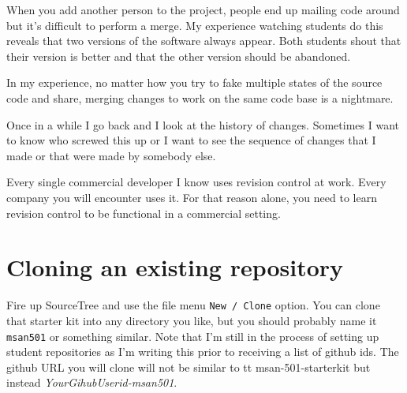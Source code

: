 \documentclass[titlepage]{tufte-book}
\begin{document}
When you add another person to the project, people end up mailing code around but it's difficult to perform a merge. My experience watching students do this reveals that two versions of the software always appear. Both students shout that their version is better and that the other version should be abandoned.

In my experience, no matter how you try to fake multiple states of the source code and share, merging changes to work on the same code base is a nightmare.

Once in a while I go back and I look at the history of changes. Sometimes I want to know who screwed this up or I want to see the sequence of changes that I made or that were made by somebody else.

Every single commercial developer I know uses revision control at work. Every company you will encounter uses it. For that reason alone, you need to learn revision control to be functional in a commercial setting.

\section{Cloning an existing repository}

Fire up SourceTree and use the file menu {\tt New / Clone} option. You can clone that starter kit into any directory you like, but you should probably name it {\tt msan501} or something similar. Note that I'm still in the process of setting up student repositories as I'm writing this prior to receiving a list of github ids. The github URL you will clone will not be similar to {tt msan-501-starterkit} but instead {\em YourGihubUserid-msan501}.
\vspace{5mm}
\end{document}
